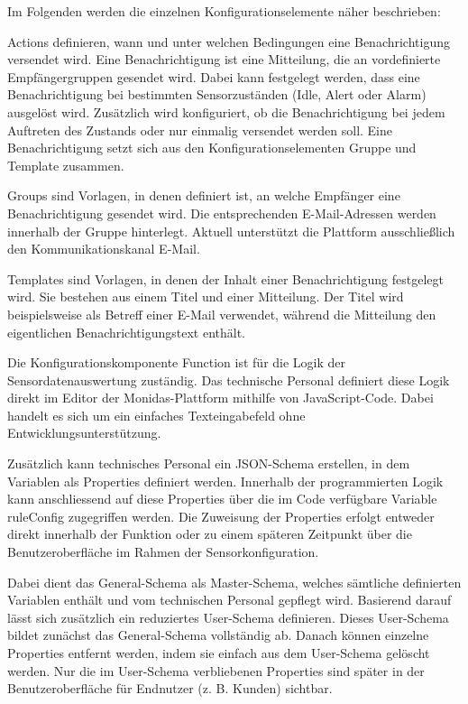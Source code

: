 Im Folgenden werden die einzelnen Konfigurationselemente näher beschrieben:

Actions definieren, wann und unter welchen Bedingungen eine Benachrichtigung versendet wird. Eine Benachrichtigung ist eine Mitteilung, die an vordefinierte Empfängergruppen gesendet wird. Dabei kann festgelegt werden, dass eine Benachrichtigung bei bestimmten Sensorzuständen (Idle, Alert oder Alarm) ausgelöst wird. Zusätzlich wird konfiguriert, ob die Benachrichtigung bei jedem Auftreten des Zustands oder nur einmalig versendet werden soll. Eine Benachrichtigung setzt sich aus den Konfigurationselementen Gruppe und Template zusammen.

Groups sind Vorlagen, in denen definiert ist, an welche Empfänger eine Benachrichtigung gesendet wird. Die entsprechenden E-Mail-Adressen werden innerhalb der Gruppe hinterlegt. Aktuell unterstützt die Plattform ausschließlich den Kommunikationskanal E-Mail.

Templates sind Vorlagen, in denen der Inhalt einer Benachrichtigung festgelegt wird. Sie bestehen aus einem Titel und einer Mitteilung. Der Titel wird beispielsweise als Betreff einer E-Mail verwendet, während die Mitteilung den eigentlichen Benachrichtigungstext enthält.

Die Konfigurationskomponente Function ist für die Logik der Sensordatenauswertung zuständig. Das technische Personal definiert diese Logik direkt im Editor der Monidas-Plattform mithilfe von JavaScript-Code. Dabei handelt es sich um ein einfaches Texteingabefeld ohne Entwicklungsunterstützung.

Zusätzlich kann technisches Personal ein JSON-Schema erstellen, in dem Variablen als Properties definiert werden. Innerhalb der programmierten Logik kann anschliessend auf diese Properties über die im Code verfügbare Variable ruleConfig zugegriffen werden. Die Zuweisung der Properties erfolgt entweder direkt innerhalb der Funktion oder zu einem späteren Zeitpunkt über die Benutzeroberfläche im Rahmen der Sensorkonfiguration. 

Dabei dient das General-Schema als Master-Schema, welches sämtliche definierten Variablen enthält und vom technischen Personal gepflegt wird. Basierend darauf lässt sich zusätzlich ein reduziertes User-Schema definieren. Dieses User-Schema bildet zunächst das General-Schema vollständig ab. Danach können einzelne Properties entfernt werden, indem sie einfach aus dem User-Schema gelöscht werden. Nur die im User-Schema verbliebenen Properties sind später in der Benutzeroberfläche für Endnutzer (z. B. Kunden) sichtbar.

